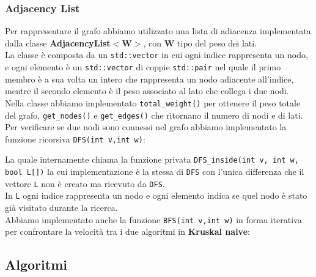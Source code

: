 \documentclass[]{article}
\begin{document}
\subsubsection{Adjacency List}
Per rappresentare il grafo abbiamo utilizzato una lista di adiacenza implementata dalla classe \textbf{AdjacencyList$<$W$>$}, con \textbf{W} tipo del peso dei lati.\\
La classe è composta da un \verb|std::vector| in cui ogni indice rappresenta un nodo, e ogni elemento è un \verb|std::vector| di coppie \verb|std::pair| nel quale il primo membro è a sua volta un intero che rappresenta un nodo adiacente all'indice, mentre il secondo elemento è il peso associato al lato che collega i due nodi.\\
Nella classe abbiamo implementato \verb|total_weight()| per ottenere il peso totale del grafo, \verb|get_nodes()| e \verb|get_edges()| che ritornano il numero di nodi e di lati.\\
Per verificare se due nodi sono connessi nel grafo abbiamo implementato la funzione ricorsiva \verb|DFS(int v,int w)|:
\lstset{language=c++, style=mystyle}

La quale internamente chiama la funzione privata \verb|DFS_inside(int v, int w, bool L[])| la cui implementazione è la stessa di \verb|DFS| con l'unica differenza che il vettore \verb|L| non è creato ma ricevuto da \verb|DFS|.\\
In \verb|L| ogni indice rappresenta un nodo e ogni elemento indica se quel nodo è stato già visitato durante la ricerca.\\
Abbiamo implementato anche la funzione \verb|BFS(int v,int w)| in forma iterativa per confrontare la velocità tra i due algoritmi in \textbf{Kruskal naive}:
\lstset{language=c++, style=mystyle}

\subsection{Algoritmi}
\end{document}
